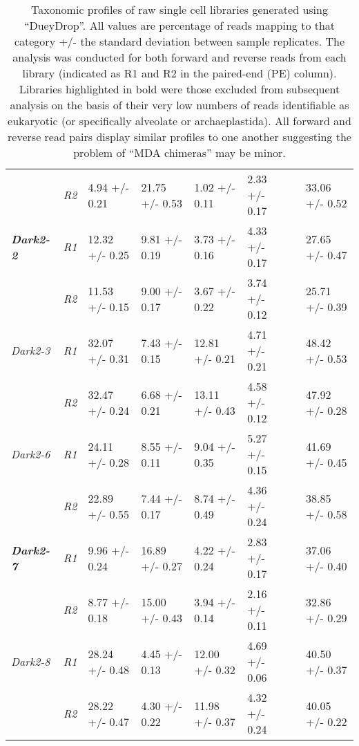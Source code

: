 \begin{table}[h!]
{\begin{tabular}{|l||l|l|l|l|l|l|l|}
                              & \textit{R2}                   & 4.94 +/- 0.21      & 21.75 +/- 0.53    & 1.02 +/- 0.11      & 2.33 +/- 0.17          &  & 33.06 +/- 0.52      \\
         \textbf{\textit{Dark2-2}}     & \textit{R1}          & 12.32 +/- 0.25     & 9.81 +/- 0.19     & 3.73 +/- 0.16      & 4.33 +/- 0.17          &  & 27.65 +/- 0.47      \\ 
                              & \textit{R2}                   & 11.53 +/- 0.15     & 9.00 +/- 0.17     & 3.67 +/- 0.22      & 3.74 +/- 0.12          &  & 25.71 +/- 0.39      \\
         \textit{Dark2-3}     & \textit{R1}                   & 32.07 +/- 0.31     & 7.43 +/- 0.15     & 12.81 +/- 0.21     & 4.71 +/- 0.21          &  & 48.42 +/- 0.53      \\ 
                              & \textit{R2}                   & 32.47 +/- 0.24     & 6.68 +/- 0.21     & 13.11 +/- 0.43     & 4.58 +/- 0.12          &  & 47.92 +/- 0.28      \\
         \textit{Dark2-6}     & \textit{R1}                   & 24.11 +/- 0.28     & 8.55 +/- 0.11     & 9.04 +/- 0.35      & 5.27 +/- 0.15          &  & 41.69 +/- 0.45      \\ 
                              & \textit{R2}                   & 22.89 +/- 0.55     & 7.44 +/- 0.17     & 8.74 +/- 0.49      & 4.36 +/- 0.24          &  & 38.85 +/- 0.58      \\
         \textbf{\textit{Dark2-7}}     & \textit{R1}          & 9.96 +/- 0.24      & 16.89 +/- 0.27    & 4.22 +/- 0.24      & 2.83 +/- 0.17          &  & 37.06 +/- 0.40      \\ 
                              & \textit{R2}                   & 8.77 +/- 0.18      & 15.00 +/- 0.43    & 3.94 +/- 0.14      & 2.16 +/- 0.11          &  & 32.86 +/- 0.29      \\
         \textit{Dark2-8}     & \textit{R1}                   & 28.24 +/- 0.48     & 4.45 +/- 0.13     & 12.00 +/- 0.32     & 4.69 +/- 0.06          &  & 40.50 +/- 0.37      \\ 
                              & \textit{R2}                   & 28.22 +/- 0.47     & 4.30 +/- 0.22     & 11.98 +/- 0.37     & 4.32 +/- 0.24          &  & 40.05 +/- 0.22      \\
         \hline
 \end{tabular}}
     \caption[DueyDrop Taxonomic Profile Summary]{Taxonomic profiles of raw single cell libraries generated using ``DueyDrop''. All values are percentage of reads mapping to that category +/- the standard deviation between sample replicates.  
         The analysis was conducted for both forward and reverse reads from each library (indicated as R1 and R2 in the paired-end (PE) column).
         Libraries highlighted in bold were those excluded from subsequent analysis on the basis of their very low numbers of reads identifiable as 
 eukaryotic (or specifically alveolate or archaeplastida). All forward and reverse read pairs display similar profiles to one another suggesting
 the problem of ``MDA chimeras'' may be minor.}
 \label{tab:sct_duey}
\end{table}

